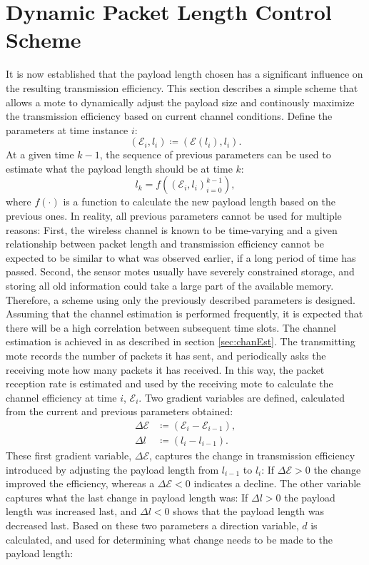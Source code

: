 \section{Dynamic Packet Length Control Scheme\label{sec:DPLC}}
It is now established that the payload length chosen has a significant influence on the resulting transmission efficiency. This section describes a simple scheme that allows a mote to dynamically adjust the payload size and continously maximize the transmission efficiency based on current channel conditions. Define the parameters at time instance $i$: 
\begin{equation}
(\mathcal{E}_i , l_i) \coloneqq (\mathcal{E}(l_i) , l_i).
\end{equation}
At a given time $k-1$, the sequence of previous parameters can be used to estimate what the payload length should be at time $k$:
\begin{equation}
l_k = f\left(
(\mathcal{E}_i , l_i )_{i=0}^{k-1}
\right),
\end{equation}
where $f(\cdot)$ is a function to calculate the new payload length based on the previous ones. In reality, all previous parameters cannot be used for multiple reasons: First, the wireless channel is known to be time-varying and a given relationship between packet length and transmission efficiency cannot be expected to be similar to what was observed earlier, if a long period of time has passed. Second, the sensor motes usually have severely constrained storage, and storing all old information could take a large part of the available memory. Therefore, a scheme using only the previously described parameters is designed. Assuming that the channel estimation is performed frequently, it is expected that there will be a high correlation between subsequent time slots. The channel estimation is achieved in as described in section \ref{sec:chanEst}. The transmitting mote records the number of packets it has sent, and periodically asks the receiving mote how many packets it has received. In this way, the packet reception rate is estimated and used by the receiving mote to calculate the channel efficiency at time $i$, $\mathcal{E}_i$. Two gradient variables are defined, calculated from the current and previous parameters obtained:
\begin{align}
\Delta \mathcal{E} &\coloneqq (\mathcal{E}_i - \mathcal{E}_{i-1}),\\
\Delta l &\coloneqq (l_i - l_{i-1}).
\end{align}
These first gradient variable, $\Delta \mathcal{E}$, captures the change in transmission efficiency introduced by adjusting the payload length from $l_{i-1}$ to $l_{i}$: If $\Delta \mathcal{E} > 0$ the change improved the efficiency, whereas a $\Delta \mathcal{E} < 0$ indicates a decline. The other variable captures what the last change in payload length was: If $\Delta l > 0$ the payload length was increased last, and $\Delta l < 0$ shows that the payload length was decreased last. Based on these two parameters a direction variable, $d$ is calculated, and used for determining what change needs to be made to the payload length:
